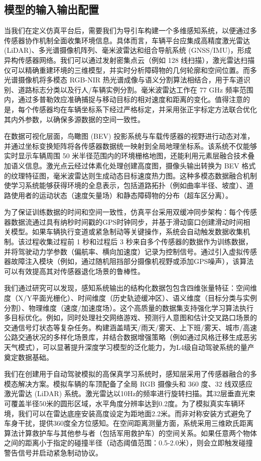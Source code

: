 \subsection{模型的输入输出配置 }

当我们在定义仿真平台后，需要我们为导引车构建一个多维感知系统，以便通过多传感器协作机制全面收集环境信息。具体而言，车辆平台应集成高精度激光雷达 (LiDAR)、多光谱摄像机阵列、毫米波雷达和组合导航系统 (GNSS/IMU)，形成异构传感器网络。我们可以通过发射密集点云（例如 128 线扫描），激光雷达扫描仪可以精确重建环境的三维模型，并实时分析障碍物的几何轮廓和空间位置。而多光谱摄像机将多模态 RGB-NIR 热光谱成像与语义分割算法相结合，用于车道识别、道路标志分类以及行人/车辆实例分割。毫米波雷达工作在 77 GHz 频率范围内，通过多普勒效应准确捕捉与移动目标的相对速度和距离的变化。值得注意的是，每个传感器均在车辆坐标系下经过严格标定，并采用张正宇标定方法联合优化其内外参数，以确保多源数据的空间一致性。

在数据可视化层面，鸟瞰图 (BEV) 投影系统与车载传感器的视野进行动态对准，并通过坐标变换矩阵将各传感器数据统一映射到全局地理坐标系。该系统不仅能够实时显示车辆周围 50 米半径范围内的环境栅格地图，还能利用元素层融合技术叠加语义信息。激光点云经过体素化处理创建高度图，摄像头输出转换为 BEV 格式的纹理特征图，毫米波雷达则生成动态目标​​速度热力图。这种多模态数据融合机制使学习系统能够获得环境的全息表示，包括道路拓扑（例如曲率半径、坡度）、道路使用者的运动状态（速度矢量场）和静态障碍物的分布（超车区分离）。

为了保证训练数据的时间和空间一致性，仿真平台采用双缓冲同步架构：每个传感器数据流通过具有纳秒时间戳的GPS时钟同步，并基于滑动窗口创建滑动时间相关模型。如果车辆执行变道或紧急制动等关键操作，系统会自动触发数据收集机制。该过程收集过程前 1 秒和过程后 3 秒来自多个传感器的数据作为训练数据，并将驾驶动力学参数（偏航率、横向加速度）记录为控制信号。通过引入虚拟传感器故障注入模块（例如，通过随机阻挡部分摄像机视野或添加GPS噪声），该算法可以有效提高其对传感器退化场景的鲁棒性。

我们通过研究可以发现，感知系统输出的结构化数据包包含四维张量特征：空间维度（X/Y平面光栅化）、时间维度（历史轨迹缓冲区）、语义维度（目标分类与实例分割）、物理维度（速度/加速度场）。这个高质量的数据集支持强化学习算法执行多目标优化。例如，同时处理社交网络游戏、预测行人意图和估计交叉路口场景的交通信号灯状态等复杂任务。构建涵盖晴天/雨天/雾天、上下班/雾天、城市/高速公路交通状况的多样化场景库，并结合数据增强策略（例如通过风格迁移生成恶劣天气模式），可以显著提升深度学习模型的泛化能力，为L4级自动驾驶系统的量产奠定数据基础。

我们在创建用于自动驾驶模拟的高保真学习系统时，感知层采用了传感器融合的多模态解决方案。模拟车辆的车顶配备了全局 RGB 摄像头和 360 度、32 线双感应激光雷达 (LiDAR) 系统。激光雷达以10Hz的频率进行旋转扫描。其32层垂直光束可覆盖半径50米的圆形区域，水平角度分辨率达到0.2度。为了模拟真实车辆环境，我们可以在雷达底座安装高度设定为距地面2.2米。而非对称安装方式避免了车身干扰，提供360度全方位感知。在空间距离测量方面，系统采用三维欧氏距离算法计算救护车与其他参与者（包括军用救护车）的空间关系。如果任意两个物体之间的距离小于指定的碰撞半径（动态阈值范围：0.5-2.0米），则会立即触发碰撞警告信号并启动紧急制动协议。

